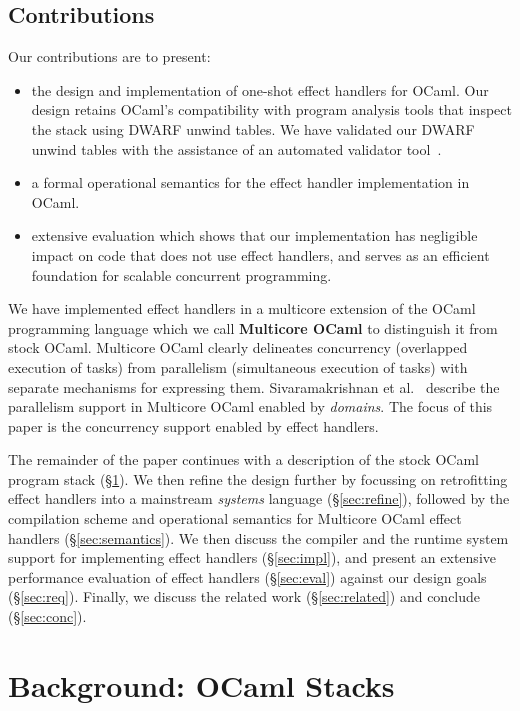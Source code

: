 \documentclass[sigplan,screen]{acmart}
\begin{document}
\subsection{Contributions}

Our contributions are to present:

\begin{itemize}
  \item the design and implementation of one-shot effect handlers for OCaml.
    Our design retains OCaml's compatibility with program analysis tools that
    inspect the stack using DWARF unwind tables. We have validated our DWARF
    unwind tables with the assistance of an automated validator
    tool~\cite{Bastian19}.
  \item a formal operational semantics for the effect handler implementation in
    OCaml.
	\item extensive evaluation which shows that our implementation has negligible
		impact on code that does not use effect handlers, and serves as an
		efficient foundation for scalable concurrent programming.
\end{itemize}

We have implemented effect handlers in a multicore extension of the OCaml
programming language which we call \textbf{Multicore OCaml} to distinguish it
from stock OCaml. Multicore OCaml clearly delineates concurrency (overlapped
execution of tasks) from parallelism (simultaneous execution of tasks) with
separate mechanisms for expressing them. Sivaramakrishnan et
al.~\cite{Sivaramakrishnan20} describe the parallelism support in Multicore
OCaml enabled by \emph{domains}. The focus of this paper is the concurrency
support enabled by effect handlers.

The remainder of the paper continues with a description of the stock OCaml
program stack (\S\ref{sec:stack}). We then refine the design further by
focussing on retrofitting effect handlers into a mainstream \emph{systems}
language (\S\ref{sec:refine}), followed by the compilation scheme and
operational semantics for Multicore OCaml effect handlers
(\S\ref{sec:semantics}).  We then discuss the compiler and the runtime system
support for implementing effect handlers (\S\ref{sec:impl}), and present an
extensive performance evaluation of effect handlers (\S\ref{sec:eval}) against
our design goals (\S\ref{sec:req}). Finally, we discuss the related work
(\S\ref{sec:related}) and conclude (\S\ref{sec:conc}).

\section{Background: OCaml Stacks}
\label{sec:stack}
\end{document}
